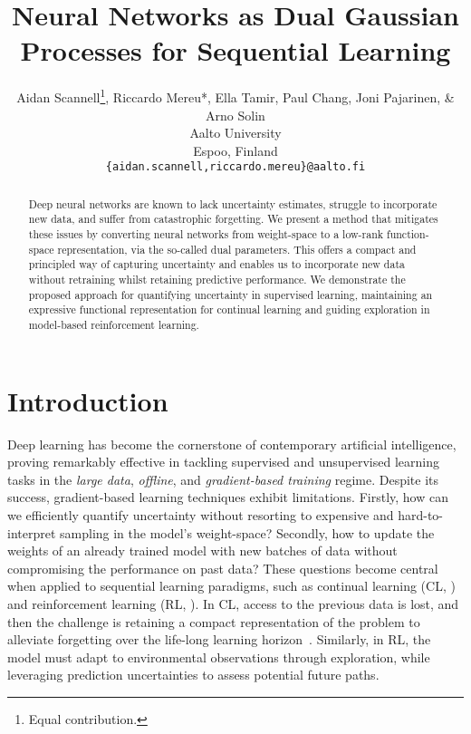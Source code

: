 \documentclass{article} %
\title{Neural Networks as Dual Gaussian Processes for Sequential Learning}
\author{Aidan Scannell\thanks{Equal contribution.}, Riccardo Mereu*, Ella Tamir, Paul Chang, Joni Pajarinen, \& Arno Solin \\
Aalto University\\
Espoo, Finland\\
\texttt{\{aidan.scannell,riccardo.mereu\}@aalto.fi}
}
\begin{document}
\maketitle

\begin{abstract}
  Deep neural networks are known to lack uncertainty estimates, struggle to incorporate new data, and suffer from catastrophic forgetting. We present a method that mitigates these issues by converting neural networks from weight-space to a low-rank function-space representation, via the so-called dual parameters. This offers a compact and principled way of capturing uncertainty and enables us to incorporate new data without retraining whilst retaining predictive performance. We demonstrate the proposed approach for quantifying uncertainty in supervised learning, maintaining an expressive functional representation for continual learning and guiding exploration in model-based reinforcement learning.
\end{abstract}


\section{Introduction}
\label{sec:intro}
%
Deep learning \cite{goodfellow2016deep} has become the cornerstone of contemporary artificial intelligence, proving remarkably effective in tackling supervised and unsupervised learning tasks in the {\em large data}, {\em offline}, and {\em gradient-based training} regime. Despite its success, gradient-based learning techniques exhibit limitations. Firstly, how can we efficiently quantify uncertainty without resorting to expensive and hard-to-interpret sampling in the model's weight-space? Secondly, how to update the weights of an already trained model with new batches of data without compromising the performance on past data? These questions become central when applied to sequential learning paradigms, such as continual learning (CL, \citep{parisi2019continual, de2021continual}) and reinforcement learning (RL, \cite{sutton2018reinforcement}). In CL, access to the previous data is lost, and then the challenge is retaining a compact representation of the problem to alleviate forgetting over the life-long learning horizon~\cite{mccloskey1989catastrophic}. Similarly, in RL, the model must adapt to environmental observations through exploration, while leveraging prediction uncertainties to assess potential future paths.

\end{document}
